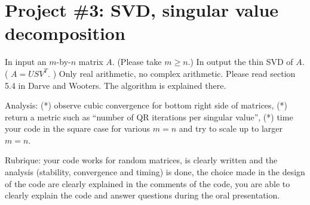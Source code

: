 \documentclass[11pt,letterpaper]{article}
\begin{document}


\section*{Project \#3: SVD, singular value decomposition}

In input an $m$-by-$n$ matrix $A$. (Please take $m\geq n$.) In output the thin SVD
of $A$. ( $A = U S V^T$. ) Only real arithmetic, no complex arithmetic. Please
read section 5.4 in Darve and Wooters. The algorithm is explained there.

Analysis: (*) observe cubic convergence for bottom right side of matrices,
(*) return a metric such as ``number of QR iterations per singular value'', (*) time
your code in the square case for various $m=n$ and try to scale up to larger $m=n$.

Rubrique: your code works for random matrices, is clearly written and the
analysis (stability, convergence and timing) is done, the choice made in the
design of the code are clearly explained in the comments of the code, you are able to clearly 
explain the code and answer questions 
during the oral presentation.




\end{document}
